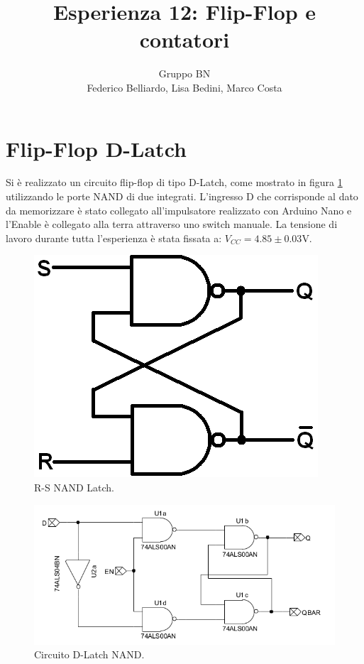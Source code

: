 \documentclass[10pt,a4paper]{article}
\author{Gruppo BN \\ Federico Belliardo, Lisa Bedini, Marco Costa}
\title{Esperienza 12: Flip-Flop e contatori}
\begin{document}
\maketitle


\section{Flip-Flop D-Latch}
Si è realizzato un circuito flip-flop di tipo D-Latch, come mostrato in figura \ref{latch} utilizzando le porte NAND di due integrati. L'ingresso D che corrisponde al dato da memorizzare è stato collegato all'impulsatore realizzato con Arduino Nano e l'Enable è collegato alla terra attraverso uno switch manuale. La tensione di lavoro durante tutta l'esperienza è stata fissata a: $V_{CC} = 4.85 \pm 0.03$V.\\


\begin{figure}
\centering
\includegraphics[scale=0.5]{latchNand.png}
\caption{R-S NAND Latch.\label{latch}}
\end{figure}

\begin{figure}
\centering
\includegraphics[scale=0.7]{flipflopDlatch.png}
\caption{Circuito  D-Latch NAND.\label{circuito}}
\end{figure}
\end{document}
